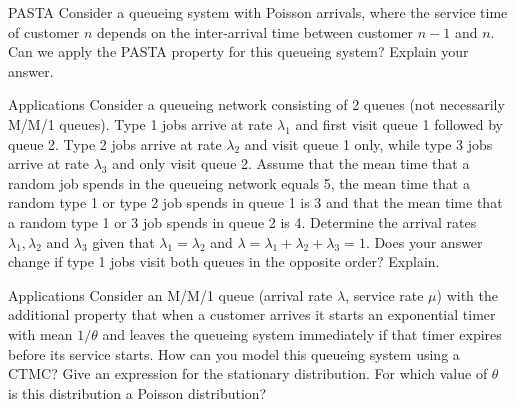 \begin{problem}{PASTA}
Consider a queueing system with Poisson arrivals, where the service time of customer \( n \) depends on the inter-arrival time between customer \( n - 1 \) and \( n \). Can we apply the PASTA property for this queueing system? Explain your answer.
\end{problem}

\begin{problem}{Applications}
Consider a queueing network consisting of 2 queues (not necessarily M/M/1 queues). Type 1 jobs arrive at rate \( \lambda_1 \) and first visit queue 1 followed by queue 2. Type 2 jobs arrive at rate \( \lambda_2 \) and visit queue 1 only, while type 3 jobs arrive at rate \( \lambda_3 \) and only visit queue 2. Assume that the mean time that a random job spends in the queueing network equals 5, the mean time that a random type 1 or type 2 job spends in queue 1 is 3 and that the mean time that a random type 1 or 3 job spends in queue 2 is 4. Determine the arrival rates \( \lambda_1, \lambda_2 \) and \( \lambda_3 \) given that \( \lambda_1 = \lambda_2 \) and \( \lambda = \lambda_1 + \lambda_2 + \lambda_3 = 1 \). Does your answer change if type 1 jobs visit both queues in the opposite order? Explain.
\end{problem}

\begin{problem}{Applications}
Consider an M/M/1 queue (arrival rate \( \lambda \), service rate \( \mu \)) with the additional property that when a customer arrives it starts an exponential timer with mean \( 1/\theta \) and leaves the queueing system immediately if that timer expires before its service starts. How can you model this queueing system using a CTMC? Give an expression for the stationary distribution. For which value of \( \theta \) is this distribution a Poisson distribution?
\end{problem}
